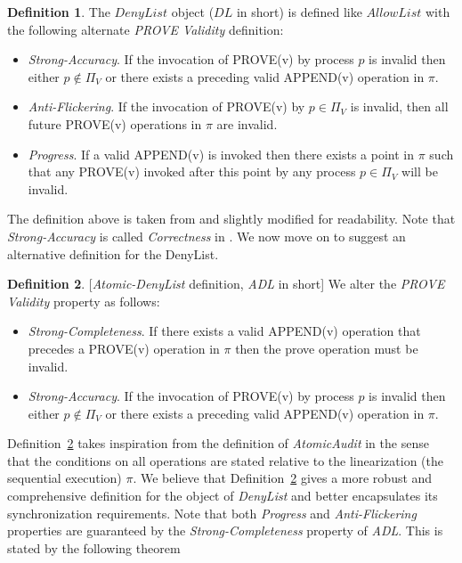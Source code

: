 \documentclass[11pt]{article}
\theoremstyle{definition}
\newtheorem{definition}{Definition}
\begin{document}
\begin{definition}
The $DenyList$ object ($DL$ in short) is defined like $AllowList$ with the following alternate \textit{\mbox{PROVE} Validity} definition:
\begin{itemize}
   \item \textit{Strong-Accuracy}. If the invocation of \mbox{PROVE}(v) by process $p$ is invalid then either $p\notin \Pi_V$ or there exists a preceding valid APPEND(v) operation in $\pi$.
  \item \textit{Anti-Flickering}. If the invocation of PROVE(v) by $p\in\Pi_V$ is invalid, then all future PROVE(v) operations in $\pi$ are invalid.
   \item \textit{Progress}. If a valid APPEND(v) is invoked then there exists a point in $\pi$ such that any PROVE(v) invoked after this point by any process $p\in \Pi_V$ will be invalid.
\end{itemize}

\end{definition}
The definition above is taken from \cite{AccessControl} and slightly modified for readability. Note that \textit{Strong-Accuracy} is called \textit{Correctness} in \cite{AccessControl}. We now move on to suggest an alternative definition for the DenyList. 

\begin{definition}\label{def:ADL}[\textit{Atomic-DenyList} definition, \textit{ADL} in short]
We alter the \textit{\mbox{PROVE} Validity} property as follows:
\begin{itemize}
   \item \textit{Strong-Completeness}. If there exists a valid \mbox{APPEND}(v) operation 
   that precedes a \mbox{PROVE}(v) operation in $\pi$ then the prove operation must be invalid. 
  \item \textit{Strong-Accuracy}. If the invocation of \mbox{PROVE}(v) by process $p$ is invalid then either $p\notin \Pi_V$ or there exists a preceding valid APPEND(v) operation in $\pi$.
\end{itemize}
\end{definition}


Definition~\ref{def:ADL} takes inspiration from the definition of \textit{AtomicAudit} in the sense that the conditions on all operations are stated relative to the linearization (the sequential execution) $\pi$. We believe that Definition~\ref{def:ADL} gives a more robust and comprehensive definition for the object of \textit{DenyList} and better encapsulates its synchronization requirements. Note that both  \textit{Progress} and \textit{Anti-Flickering} properties are guaranteed by the \textit{Strong-Completeness} property of \textit{ADL}. This is stated by the following theorem
\end{document}
